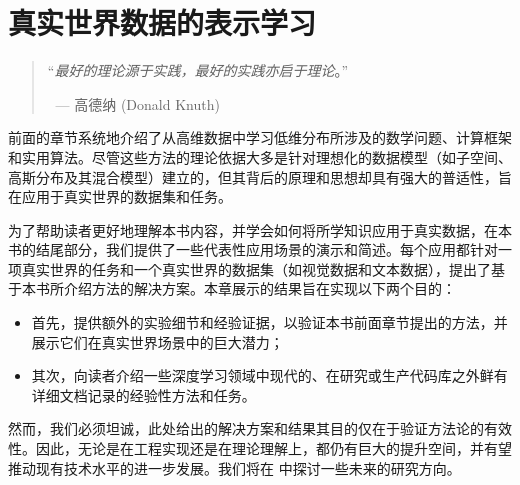 \documentclass[../../book-main_zh.tex]{subfiles}
\begin{document}
\chapter{真实世界数据的表示学习}
\label{ch:applications}

\begin{quote}
\hfill    ``{\em 最好的理论源于实践，最好的实践亦启于理论}。''

$~$ \hfill --- 高德纳 (Donald Knuth)
\end{quote}
\vspace{5mm}

前面的章节系统地介绍了从高维数据中学习低维分布所涉及的数学问题、计算框架和实用算法。尽管这些方法的理论依据大多是针对理想化的数据模型（如子空间、高斯分布及其混合模型）建立的，但其背后的原理和思想却具有强大的普适性，旨在应用于真实世界的数据集和任务。

为了帮助读者更好地理解本书内容，并学会如何将所学知识应用于真实数据，在本书的结尾部分，我们提供了一些代表性应用场景的演示和简述。每个应用都针对一项真实世界的任务和一个真实世界的数据集（如视觉数据和文本数据），提出了基于本书所介绍方法的解决方案。本章展示的结果旨在实现以下两个目的：
\begin{itemize}
    \item 首先，提供额外的实验细节和经验证据，以验证本书前面章节提出的方法，并展示它们在真实世界场景中的巨大潜力；
    \item 其次，向读者介绍一些深度学习领域中现代的、在研究或生产代码库之外鲜有详细文档记录的经验性方法和任务。
\end{itemize}
然而，我们必须坦诚，此处给出的解决方案和结果其目的仅在于验证方法论的有效性。因此，无论是在工程实现还是在理论理解上，都仍有巨大的提升空间，并有望推动现有技术水平的进一步发展。我们将在  中探讨一些未来的研究方向。



\end{document}
